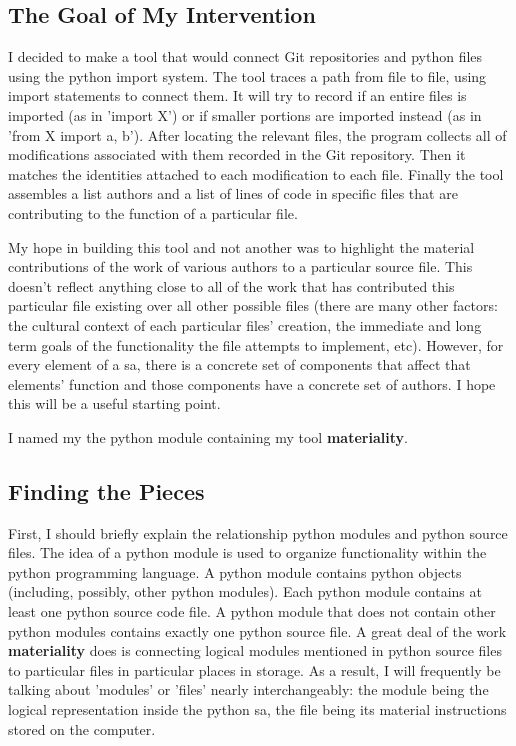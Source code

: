 \documentclass[a4paper,man,natbib,floatsintext]{apa6}
\begin{document}
  \subsection{The Goal of My Intervention}
  I decided to make a tool that would connect Git repositories and \Gls{python} files using the \Gls{python} import system. The tool traces a path from file to file, using import statements to connect them. It will try to record if an entire files is imported (as in 'import X') or if smaller portions are imported instead (as in 'from X import a, b'). After locating the relevant files, the program collects all of modifications associated with them recorded in the Git repository. Then it matches the identities attached to each modification to each file. Finally the tool assembles a list authors and a list of lines of code in specific files that are contributing to the function of a particular file.

  My hope in building this tool and not another was to highlight the material contributions of the work of various authors to a particular source file. This doesn't reflect anything close to all of the work that has contributed this particular file existing over all other possible files (there are many other factors: the cultural context of each particular files' creation, the immediate and long term goals of the functionality the file attempts to implement, etc). However, for every element of a \gls{sa}, there is a concrete set of components that affect that elements' function and those components have a concrete set of authors. I hope this will be a useful starting point.

  I named my the \Gls{python} module containing my tool \textbf{materiality}.

  \subsection{Finding the Pieces}
  First, I should briefly explain the relationship \Gls{python} modules and \Gls{python} source files. The idea of a \Gls{python} module is used to organize functionality within the \Gls{python} programming language. A \Gls{python} module contains \Gls{python} objects (including, possibly, other \Gls{python} modules). Each \Gls{python} module contains at least one \Gls{python} source code file. A \Gls{python} module that does not contain other \Gls{python} modules contains exactly one \Gls{python} source file. A great deal of the work \textbf{materiality} does is connecting logical modules mentioned in \Gls{python} source files to particular files in particular places in storage. As a result, I will frequently be talking about 'modules' or 'files' nearly interchangeably: the module being the logical representation inside the \Gls{python} \gls{sa}, the file being its material instructions stored on the computer.
\end{document}
